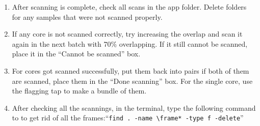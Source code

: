 \documentclass[11pt,letter]{article}
\begin{document}
\begin{enumerate}
\item After scanning is complete, check all scans in the app folder. Delete folders for any samples that were not scanned properly.
\item If any core is not scanned correctly, try increasing the overlap and scan it again in the next batch with 70\% overlapping. If it still cannot be scanned, place it in the “Cannot be scanned” box.
\item For cores got scanned successfully, put them back into pairs if both of them are scanned, place them in the ``Done scanning'' box. For the single core, use the flagging tap to make a bundle of them.
\item After checking all the scannings, in the terminal, type the following command to to get rid of all the frames:``\texttt{find . -name \textbackslash frame* -type f -delete}''
	\end{enumerate}
\end{document}
